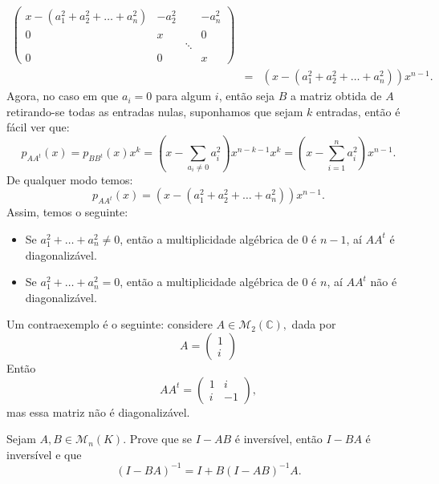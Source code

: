 \documentclass[11pt,a4paper]{article}
\begin{document}
{\[\begin{array}{rcl}
\begin{pmatrix}
x-(a_1^2+a_2^2+\dots+a_n^2)&-a_2^2&&-a_n^2\\0&x&&0\\&&\ddots&\\0&0&&x
\end{pmatrix}\\&=&
\left(x-\left(a_1^2+a_2^2+\dots+a_n^2\right)\right)x^{n-1}.
\end{array}
\]
Agora, no caso em que $a_i=0$ para algum $i$, então seja $B$ a matriz obtida de $A$ retirando-se todas as entradas nulas, suponhamos que sejam $k$ entradas, então é fácil ver que:
\[
p_{AA^t}(x)=p_{BB^t}(x)x^k=\left(x-\sum_{a_i\neq 0}a_i^2\right)x^{n-k-1}x^k=\left(x-\sum_{i=1}^na_i^2\right)x^{n-1}.
\]
De qualquer modo temos:
\[
p_{AA^t}(x)=\left(x-\left(a_1^2+a_2^2+\dots+a_n^2\right)\right)x^{n-1}.
\]
Assim, temos o seguinte:
\begin{itemize}
\item Se $a_1^2+\dots+a_n^2\neq 0$, então a multiplicidade algébrica de $0$ é $n-1$, aí $AA^t$ é diagonalizável.
\item Se $a_1^2+\dots+a_n^2=0$, então a multiplicidade algébrica de $0$ é $n$, aí $AA^t$ não é diagonalizável.
\end{itemize}

Um contraexemplo é o seguinte: considere $A \in \mathcal{M}_2(\mathbb{C}),$ dada por
\[
A = \begin{pmatrix}1 \\i
\end{pmatrix}
\]
Então
\[
AA^t = \begin{pmatrix}
1 & i \\ i & -1
\end{pmatrix},
\]
mas essa matriz não é diagonalizável.
}
   
 Sejam $A, B \in \mathcal{M}_n(K).$ Prove que se $I - AB$ é inversível, então $I - BA$ é inversível e que
\[
(I - BA)^{-1} = I + B(I-AB)^{-1}A.
\]
    
   
\end{document}
